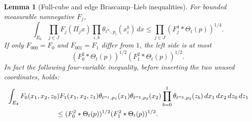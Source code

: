 \documentclass[12pt,reqno]{amsart}
\theoremstyle{plain}
\newtheorem{lemma}[theorem]{Lemma}
\theoremstyle{definition}
\theoremstyle{remark}
\numberwithin{equation}{section}
\newcommand{\dd}{\,d}
\begin{document}
\begin{lemma}[Full-cube and edge Brascamp--Lieb inequalities]\label{lem:bl}
For bounded measurable nonnegative $F_j$,
\begin{equation}\label{eq:bl4}
 \int_{E_6}\prod_{j\in J}F_j(\Pi_jx)
    \prod_{i,b}\theta_{t^{\alpha_i},p_i}(x_i^b)\dd x
 \le\prod_{j\in J}(F_j^4*\Theta_t(p))^{1/4}.
\end{equation}
If only $F_{000}=F_0$ and $F_{001}=F_1$ differ from $1$, the left
side is at most
\begin{equation}\label{eq:bl2}
 (F_0^2*\Theta_t(p))^{1/2}(F_1^2*\Theta_t(p))^{1/2}.
\end{equation}
In fact the following four-variable inequality, before inserting the
two unused coordinates, holds:
\begin{align}
 &\int_{E_4} F_0(x_1,x_2,z_0)F_1(x_1,x_2,z_1)
       \theta_{t^{\alpha_1},p_1}(x_1)
       \theta_{t^{\alpha_2},p_2}(x_2)
       \prod_{b=0}^1\theta_{t^{\alpha_3},p_3}(z_b)
       \dd x_1\dd x_2\dd z_0\dd z_1\notag\\
 &\hspace{25mm}\le
 (F_0^2*\Theta_t(p))^{1/2}(F_1^2*\Theta_t(p))^{1/2}.
 \label{eq:edge_bl_four_variables}
\end{align}
\end{lemma}
\end{document}
